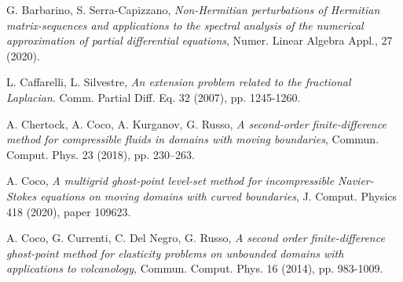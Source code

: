 \documentclass{amsart}
\begin{document}
\begin{thebibliography}{}
 G. Barbarino, S. Serra-Capizzano, {\it Non-Hermitian perturbations of Hermitian matrix-sequences and applications to the spectral analysis of the numerical approximation of partial differential equations}, Numer. Linear Algebra Appl., 27 (2020).

  L. Caffarelli, L. Silvestre, {\it An extension problem related to the fractional Laplacian}. Comm. Partial Diff. Eq. 32 (2007), pp. 1245-1260.

 A. Chertock, A. Coco, A. Kurganov, G. Russo, {\it A second-order finite-difference method for compressible fluids in domains with moving boundaries}, Commun. Comput. Phys. 23 (2018), pp. 230–263.


 A. Coco, {\it A multigrid ghost-point level-set method for incompressible Navier-Stokes equations on moving domains with curved boundaries}, J. Comput. Physics 418 (2020), paper 109623.

 A. Coco, G. Currenti, C. Del Negro, G. Russo, {\it A second order finite-difference ghost-point method for elasticity problems on unbounded domains with applications to volcanology}, Commun. Comput. Phys. 16 (2014), pp. 983-1009.
%
%
%
%
%


%
%
%


\end{thebibliography}
\end{document}
